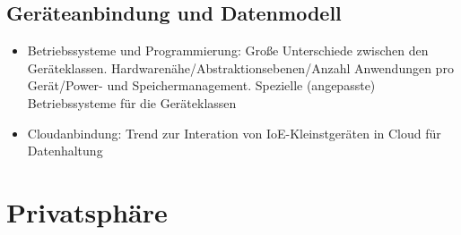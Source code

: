 \subsection{Geräteanbindung und Datenmodell}
\begin{itemize}
	\item Betriebssysteme und Programmierung: Große Unterschiede zwischen den Geräteklassen. Hardwarenähe/Abstraktionsebenen/Anzahl Anwendungen pro Gerät/Power- und Speichermanagement. Spezielle (angepasste) Betriebssysteme für die Geräteklassen
	\item Cloudanbindung: Trend zur Interation von IoE-Kleinstgeräten in Cloud für Datenhaltung
\end{itemize}



\section{Privatsphäre}

